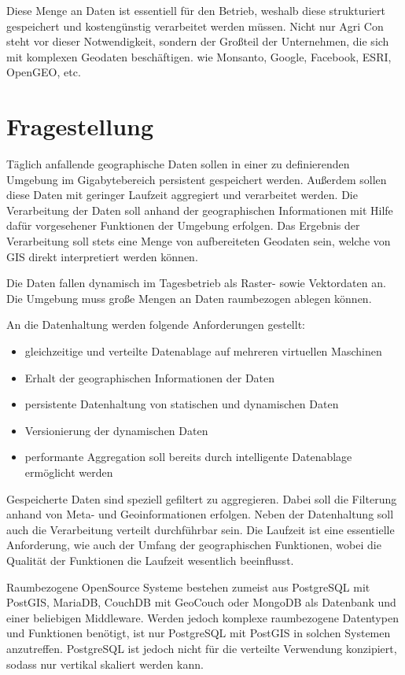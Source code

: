 \documentclass[
a4paper,     %
12pt         %
]{scrartcl}  %
\begin{document}
Diese Menge an Daten ist essentiell für den Betrieb, weshalb diese strukturiert gespeichert und kostengünstig verarbeitet werden müssen.
Nicht nur Agri Con steht vor dieser Notwendigkeit, sondern der Großteil der Unternehmen, die sich mit komplexen Geodaten beschäftigen.
wie Monsanto, Google, Facebook, ESRI, OpenGEO, etc.


\section{Fragestellung}

Täglich anfallende geographische Daten sollen in einer zu definierenden Umgebung im Gigabytebereich persistent gespeichert werden.
Außerdem sollen diese Daten mit geringer Laufzeit aggregiert und verarbeitet werden.
Die Verarbeitung der Daten soll anhand der geographischen Informationen mit Hilfe dafür vorgesehener Funktionen der Umgebung erfolgen.
Das Ergebnis der Verarbeitung soll stets eine Menge von aufbereiteten Geodaten sein, welche von GIS direkt interpretiert werden können.

Die Daten fallen dynamisch im Tagesbetrieb als Raster- sowie Vektordaten an.
Die Umgebung muss große Mengen an Daten raumbezogen ablegen können.

An die Datenhaltung werden folgende Anforderungen gestellt:
\begin{itemize}
\item gleichzeitige und verteilte Datenablage auf mehreren virtuellen Maschinen
\item Erhalt der geographischen Informationen der Daten
\item persistente Datenhaltung von statischen und dynamischen Daten
\item Versionierung der dynamischen Daten
\item performante Aggregation soll bereits durch intelligente Datenablage ermöglicht werden
\end{itemize}

Gespeicherte Daten sind speziell gefiltert zu aggregieren.
Dabei soll die Filterung anhand von Meta- und Geoinformationen erfolgen.
Neben der Datenhaltung soll auch die Verarbeitung verteilt durchführbar sein.
Die Laufzeit ist eine essentielle Anforderung, wie auch der Umfang der geographischen Funktionen, wobei die Qualität der Funktionen die Laufzeit wesentlich beeinflusst.


Raumbezogene OpenSource Systeme bestehen zumeist aus PostgreSQL mit PostGIS, MariaDB, CouchDB mit GeoCouch oder MongoDB als Datenbank und einer beliebigen Middleware.
Werden jedoch komplexe raumbezogene Datentypen und Funktionen benötigt, ist nur PostgreSQL mit PostGIS in solchen Systemen anzutreffen.
PostgreSQL ist jedoch nicht für die verteilte Verwendung konzipiert, sodass nur vertikal skaliert werden kann.
\end{document}
